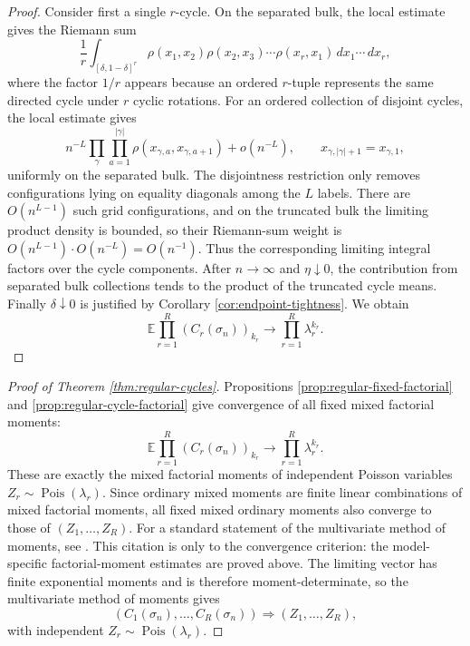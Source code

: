 \documentclass[11pt]{article}
\theoremstyle{remark}
\newcommand{\Ee}{\mathbb E}
\newcommand{\Pois}{\operatorname{Pois}}
\newcommand{\dd}{\,d}
\begin{document}
\begin{proof}
Consider first a single \(r\)-cycle.  On the separated bulk, the local estimate gives the Riemann sum
\[
        \frac1r
        \int_{[\delta,1-\delta]^r}
        \rho(x_1,x_2)\rho(x_2,x_3)\cdots\rho(x_r,x_1)
        \dd x_1\cdots\dd x_r,
\]
where the factor \(1/r\) appears because an ordered \(r\)-tuple represents the same directed cycle under \(r\) cyclic rotations.  For an ordered collection of disjoint cycles, the local estimate gives
\[
        n^{-L}\prod_{\gamma}\prod_{a=1}^{|\gamma|}
        \rho(x_{\gamma,a},x_{\gamma,a+1})+o(n^{-L}),
        \qquad x_{\gamma,|\gamma|+1}=x_{\gamma,1},
\]
uniformly on the separated bulk.  The disjointness restriction only removes configurations lying on equality diagonals among the \(L\) labels.  There are \(O(n^{L-1})\) such grid configurations, and on the truncated bulk the limiting product density is bounded, so their Riemann-sum weight is \(O(n^{L-1})\cdot O(n^{-L})=O(n^{-1})\).  Thus the corresponding limiting integral factors over the cycle components.  After \(n\to\infty\) and \(\eta\downarrow0\), the contribution from separated bulk collections tends to the product of the truncated cycle means.  Finally \(\delta\downarrow0\) is justified by Corollary \ref{cor:endpoint-tightness}.  We obtain
\[
        \Ee\prod_{r=1}^R(C_r(\sigma_n))_{k_r}
        \to \prod_{r=1}^R\lambda_r^{k_r}.
\]
\end{proof}

\begin{proof}[Proof of Theorem \ref{thm:regular-cycles}]
Propositions \ref{prop:regular-fixed-factorial} and
\ref{prop:regular-cycle-factorial} give convergence of all fixed mixed
factorial moments:
\[
        \Ee\prod_{r=1}^R(C_r(\sigma_n))_{k_r}
        \to
        \prod_{r=1}^R\lambda_r^{k_r}.
\]
These are exactly the mixed factorial moments of independent Poisson variables
\(Z_r\sim\Pois(\lambda_r)\).  Since ordinary mixed moments are finite linear
combinations of mixed factorial moments, all fixed mixed ordinary moments also
converge to those of \((Z_1,\ldots,Z_R)\).  
For a standard statement of the multivariate method of moments, see
\cite{Billingsley1995}.  This citation is only to the convergence criterion:
the model-specific factorial-moment estimates are proved above.
The limiting vector has finite
exponential moments and is therefore moment-determinate, so the multivariate
method of moments gives
\[
        (C_1(\sigma_n),\ldots,C_R(\sigma_n))
        \Rightarrow (Z_1,\ldots,Z_R),
\]
with independent \(Z_r\sim\Pois(\lambda_r)\).
\end{proof}
\end{document}
